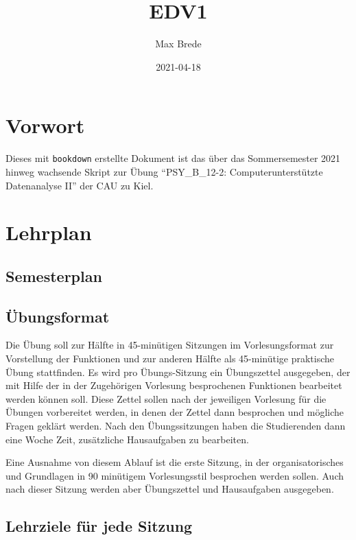 \documentclass[
]{book}
\title{EDV1}
\author{Max Brede}
\date{2021-04-18}
\begin{document}
\maketitle

{
\setcounter{tocdepth}{1}
\tableofcontents
}
\hypertarget{vorwort}{%
\chapter{Vorwort}\label{vorwort}}

Dieses mit \texttt{bookdown} erstellte Dokument ist das über das Sommersemester 2021 hinweg wachsende Skript zur Übung ``PSY\_B\_12-2: Computerunterstützte Datenanalyse II'' der CAU zu Kiel.

\hypertarget{lehrplan}{%
\chapter{Lehrplan}\label{lehrplan}}

\hypertarget{semesterplan}{%
\section{Semesterplan}\label{semesterplan}}

\hypertarget{uxfcbungsformat}{%
\section{Übungsformat}\label{uxfcbungsformat}}

Die Übung soll zur Hälfte in 45-minütigen Sitzungen im Vorlesungsformat zur Vorstellung der Funktionen und zur anderen Hälfte als 45-minütige praktische Übung stattfinden.
Es wird pro Übungs-Sitzung ein Übungszettel ausgegeben, der mit Hilfe der in der Zugehörigen Vorlesung besprochenen Funktionen bearbeitet werden können soll.
Diese Zettel sollen nach der jeweiligen Vorlesung für die Übungen vorbereitet werden, in denen der Zettel dann besprochen und mögliche Fragen geklärt werden.
Nach den Übungssitzungen haben die Studierenden dann eine Woche Zeit, zusätzliche Hausaufgaben zu bearbeiten.

Eine Ausnahme von diesem Ablauf ist die erste Sitzung, in der organisatorisches und Grundlagen in 90 minütigem Vorlesungsstil besprochen werden sollen. Auch nach dieser Sitzung werden aber Übungszettel und Hausaufgaben ausgegeben.

\hypertarget{lehrziele-fuxfcr-jede-sitzung}{%
\section{Lehrziele für jede Sitzung}\label{lehrziele-fuxfcr-jede-sitzung}}
\end{document}
